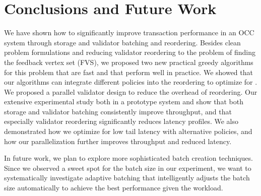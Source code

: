 \section{Conclusions and Future Work}\label{sec:conclusion}

We have shown how to significantly improve transaction performance in an OCC system through storage and validator batching and reordering. Besides clean problem formulations and
reducing validator reordering to the problem of finding the  feedback vertex set (FVS), we proposed two new practical greedy algorithms for this problem
that are fast and that perform well in practice. We showed that our algorithms can integrate different policies into the reordering to optimize for . We  proposed a parallel validator design to reduce the overhead of reordering. Our extensive experimental study both in a prototype system and  show that both storage and validator batching consistently improve throughput, and that especially validator reordering 
significantly reduces latency profiles. We also demonstrated how we optimize for low tail latency with alternative policies, and how our parallelization further improves
throughput and reduced latency.

In future work, we plan to explore more sophisticated batch creation techniques. Since we observed a sweet spot for the  batch size in our experiment, we want to systematically investigate adaptive batching that intelligently adjusts the batch size automatically to achieve the best performance given the workload. 
